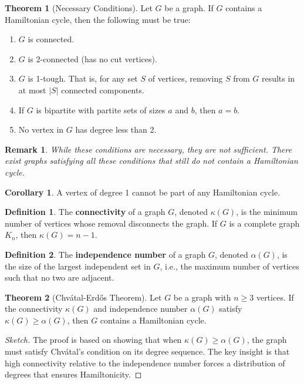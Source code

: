 \documentclass{article}
\newtheorem{remark}{Remark}
\theoremstyle{definition}
\newtheorem{theorem}{Theorem}
\newtheorem{corollary}{Corollary}
\newtheorem{definition}{Definition}
\begin{document}
\begin{theorem}[Necessary Conditions]
Let $G$ be a graph. If $G$ contains a Hamiltonian cycle, then the following must be true:
\begin{enumerate}
    \item $G$ is connected.
    \item $G$ is 2-connected (has no cut vertices).
    \item $G$ is 1-tough. That is, for any set $S$ of vertices, removing $S$ from $G$ results in at most $|S|$ connected components.
    \item If $G$ is bipartite with partite sets of sizes $a$ and $b$, then $a = b$.
    \item No vertex in $G$ has degree less than 2.
\end{enumerate}
\end{theorem}

\begin{remark}
While these conditions are necessary, they are not sufficient. There exist graphs satisfying all these conditions that still do not contain a Hamiltonian cycle.
\end{remark}


\begin{corollary}
A vertex of degree 1 cannot be part of any Hamiltonian cycle.
\end{corollary}

\begin{definition}
The \textbf{connectivity} of a graph $G$, denoted $\kappa(G)$, is the minimum number of vertices whose removal disconnects the graph. If $G$ is a complete graph $K_n$, then $\kappa(G) = n-1$.
\end{definition}

\begin{definition}
The \textbf{independence number} of a graph $G$, denoted $\alpha(G)$, is the size of the largest independent set in $G$, i.e., the maximum number of vertices such that no two are adjacent.
\end{definition}

\begin{theorem}[Chvátal-Erdős Theorem]
Let $G$ be a graph with $n \geq 3$ vertices. If the connectivity $\kappa(G)$ and independence number $\alpha(G)$ satisfy $\kappa(G) \geq \alpha(G)$, then $G$ contains a Hamiltonian cycle.
\end{theorem}

\begin{proof}[Sketch]
The proof is based on showing that when $\kappa(G) \geq \alpha(G)$, the graph must satisfy Chvátal's condition on its degree sequence. The key insight is that high connectivity relative to the independence number forces a distribution of degrees that ensures Hamiltonicity.
\end{proof}
\end{document}
